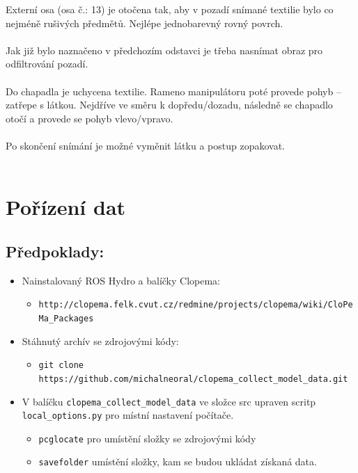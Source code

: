 \documentclass[10pt,a4paper,titlepage,oneside]{report}
\begin{document}
Externí osa (osa č.: 13) je otočena tak, aby v pozadí snímané textilie bylo co nejméně rušivých předmětů. Nejlépe jednobarevný rovný povrch.
\\
\\
Jak již bylo naznačeno v předchozím odstavci je třeba nasnímat obraz pro odfiltrování pozadí.\\
\\
Do chapadla je uchycena textilie. Rameno manipulátoru poté provede pohyb – zatřepe s látkou. Nejdříve ve směru k dopředu/dozadu, následně se chapadlo otočí a provede se pohyb vlevo/vpravo.\\
\\
Po skončení snímání je možné vyměnit látku a postup zopakovat.\\
\\

\chapter{Pořízení dat}
\section{Předpoklady:}

\begin{itemize}
  \item Nainstalovaný ROS Hydro a balíčky Clopema:
  \begin{itemize} 
  
  	\item \verb|http://clopema.felk.cvut.cz/redmine/projects/clopema/wiki/CloPeMa_Packages|
  \end{itemize}
  
  \item Stáhnutý archív se zdrojovými kódy:
  \begin{itemize}
  	\item \verb|git clone https://github.com/michalneoral/clopema_collect_model_data.git|
  \end{itemize}
  
  \item V balíčku \verb|clopema_collect_model_data| ve složce src upraven scritp \verb|local_options.py| pro místní nastavení počítače.
  \begin{itemize}
  	\item \verb|pcglocate| pro umístění složky se zdrojovými kódy
  	\item \verb|savefolder| umístění složky, kam se budou ukládat získaná data.
  \end{itemize}  
\end{itemize}
\end{document}
